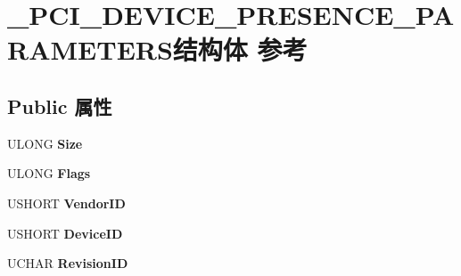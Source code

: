\hypertarget{struct___p_c_i___d_e_v_i_c_e___p_r_e_s_e_n_c_e___p_a_r_a_m_e_t_e_r_s}{}\section{\+\_\+\+P\+C\+I\+\_\+\+D\+E\+V\+I\+C\+E\+\_\+\+P\+R\+E\+S\+E\+N\+C\+E\+\_\+\+P\+A\+R\+A\+M\+E\+T\+E\+R\+S结构体 参考}
\label{struct___p_c_i___d_e_v_i_c_e___p_r_e_s_e_n_c_e___p_a_r_a_m_e_t_e_r_s}
\subsection*{Public 属性}
\begin{DoxyCompactItemize}
\item 
\mbox{\label{struct___p_c_i___d_e_v_i_c_e___p_r_e_s_e_n_c_e___p_a_r_a_m_e_t_e_r_s_a1fba7b8e716f303420968f4a5ebebc74}} 
U\+L\+O\+NG {\bfseries Size}
\item 
\mbox{\label{struct___p_c_i___d_e_v_i_c_e___p_r_e_s_e_n_c_e___p_a_r_a_m_e_t_e_r_s_aae438bec92d976aafc30828c9c934b37}} 
U\+L\+O\+NG {\bfseries Flags}
\item 
\mbox{\label{struct___p_c_i___d_e_v_i_c_e___p_r_e_s_e_n_c_e___p_a_r_a_m_e_t_e_r_s_a27183a2b660823a33055eb47d680adb4}} 
U\+S\+H\+O\+RT {\bfseries Vendor\+ID}
\item 
\mbox{\label{struct___p_c_i___d_e_v_i_c_e___p_r_e_s_e_n_c_e___p_a_r_a_m_e_t_e_r_s_a25254883e10aa0c027e0c7e6577f66b0}} 
U\+S\+H\+O\+RT {\bfseries Device\+ID}
\item 
\mbox{\label{struct___p_c_i___d_e_v_i_c_e___p_r_e_s_e_n_c_e___p_a_r_a_m_e_t_e_r_s_a91e7086ad7e8a06ac1172a0c2dd163eb}} 
U\+C\+H\+AR {\bfseries Revision\+ID}
\item 
\mbox{\label{struct___p_c_i___d_e_v_i_c_e___p_r_e_s_e_n_c_e___p_a_r_a_m_e_t_e_r_s_a41ecfe57bc50855f09e8220b09cffd81}} 

\end{DoxyCompactItemize}
